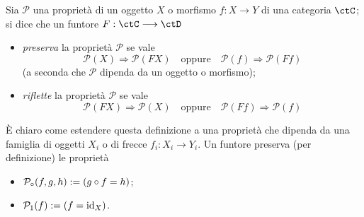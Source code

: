 \begin{definition}\label{def_preserva_riflette}
	Sia \(\mathcal{P}\) una proprietà di un oggetto \(X\) o morfismo \(f : X\to Y\) di una categoria \(\ctC\); si dice che un funtore \(F : \ctC \fun\ctD\)
	\begin{itemize}
		\item \emph{preserva} la proprietà \(\mathcal{P}\) se vale
		      \[\mathcal{P}(X) \Rightarrow \mathcal{P}(FX) \quad \text{oppure} \quad
			      \mathcal{P}(f) \Rightarrow \mathcal{P}(Ff) \]
		      (a seconda che \(\mathcal P\) dipenda da un oggetto o morfismo);
		\item \emph{riflette} la proprietà \(\mathcal{P}\) se vale
		      \[\mathcal{P}(FX) \Rightarrow \mathcal{P}(X) \quad \text{oppure} \quad
			      \mathcal{P}(Ff) \Rightarrow \mathcal{P}(f) \]
	\end{itemize}
	\`E chiaro come estendere questa definizione a una proprietà che dipenda da una famiglia di oggetti \(X_i\) o di frecce \(f_i : X_i\to Y_i\). Un funtore preserva (per definizione) le proprietà
	\begin{itemize}
		\item \(\mathcal P_\circ(f,g,h) := (g\circ f = h)\);
		\item \(\mathcal P_1(f) := (f = \mathrm{id}_X)\).
	\end{itemize}
\end{definition}
